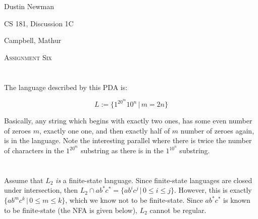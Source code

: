 \documentclass{article}
\begin{document}
\noindent
Dustin Newman

\noindent
CS 181, Discussion 1C

\noindent
Campbell, Mathur

{\centering
\Large{\textsc{Assignment Six}}
\par}

\section{}
The language described by this PDA is:

$$
L := \{1^20^m10^n \,|\, m = 2n\}
$$

\noindent
Basically, any string which begins with exactly two ones, has some even number of zeroes $m$, exactly one one, and then exactly half of $m$ number of zeroes again, is in the language. Note the interesting parallel where there is twice the number of characters in the $1^20^m$ substring as there is in the $1^10^n$ substring.

\newpage

\section{}
Assume that $L_2$ \textit{is} a finite-state language. Since finite-state languages are closed under intersection, then $L_2 \cap ab^*c^* = \{ab^ic^j \,|\, 0 \leq i \leq j\}$. However, this is exactly $\{ab^mc^k \,|\, 0 \leq m \leq k\}$, which we know not to be finite-state. Since $ab^*c^*$ is known to be finite-state (the NFA is given below), $L_2$ cannot be regular.

\begin{center}
\end{center}
\end{document}
